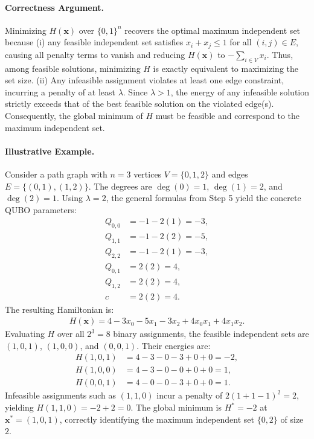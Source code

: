 \documentclass[12pt]{article}
\begin{document}
\paragraph{Correctness Argument.}
Minimizing $H(\mathbf{x})$ over $\{0,1\}^n$ recovers the optimal maximum independent set because (i) any feasible independent set satisfies $x_i + x_j \le 1$ for all $(i,j) \in E$, causing all penalty terms to vanish and reducing $H(\mathbf{x})$ to $-\sum_{i \in V} x_i$. Thus, among feasible solutions, minimizing $H$ is exactly equivalent to maximizing the set size. (ii) Any infeasible assignment violates at least one edge constraint, incurring a penalty of at least $\lambda$. Since $\lambda > 1$, the energy of any infeasible solution strictly exceeds that of the best feasible solution on the violated edge(s). Consequently, the global minimum of $H$ must be feasible and correspond to the maximum independent set.

\paragraph{Illustrative Example.}
Consider a path graph with $n=3$ vertices $V=\{0,1,2\}$ and edges $E=\{(0,1), (1,2)\}$. The degrees are $\deg(0)=1$, $\deg(1)=2$, and $\deg(2)=1$. Using $\lambda=2$, the general formulas from Step 5 yield the concrete QUBO parameters:
\begin{align}
Q_{0,0} &= -1 - 2(1) = -3, \\
Q_{1,1} &= -1 - 2(2) = -5, \\
Q_{2,2} &= -1 - 2(1) = -3, \\
Q_{0,1} &= 2(2) = 4, \\
Q_{1,2} &= 2(2) = 4, \\
c &= 2(2) = 4.
\end{align}
The resulting Hamiltonian is:
\begin{align}
H(\mathbf{x}) = 4 - 3x_0 - 5x_1 - 3x_2 + 4x_0 x_1 + 4x_1 x_2.
\end{align}
Evaluating $H$ over all $2^3=8$ binary assignments, the feasible independent sets are $(1,0,1)$, $(1,0,0)$, and $(0,0,1)$. Their energies are:
\begin{align}
H(1,0,1) &= 4 - 3 - 0 - 3 + 0 + 0 = -2, \\
H(1,0,0) &= 4 - 3 - 0 - 0 + 0 + 0 = 1, \\
H(0,0,1) &= 4 - 0 - 0 - 3 + 0 + 0 = 1.
\end{align}
Infeasible assignments such as $(1,1,0)$ incur a penalty of $2(1+1-1)^2 = 2$, yielding $H(1,1,0) = -2 + 2 = 0$. The global minimum is $H^* = -2$ at $\mathbf{x}^* = (1,0,1)$, correctly identifying the maximum independent set $\{0,2\}$ of size $2$.
\end{document}
